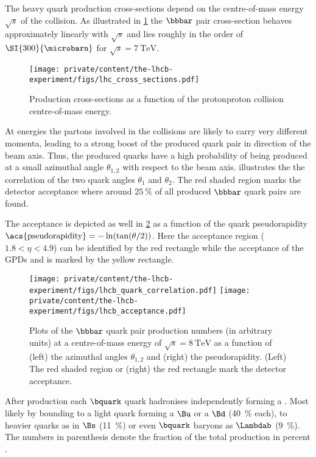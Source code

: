 The heavy quark production cross-sections depend on the centre-of-mass energy
$\sqrt{s}$ of the \protonproton collision. As illustrated in
\cref{fig:lhcb_experiment:detector:cross_section} the $\bbbar$ pair
cross-section behaves approximately linearly with $\sqrt{s}$ and lies roughly in
the order of $\SI{300}{\microbarn}$ for $\sqrt{s}=\SI{7}{\TeV}$.
%
\begin{figure}[t]
  \centering
    \texttt{[image: private/content/the-lhcb-experiment/figs/lhc\_cross\_sections.pdf]}
  \caption{
    Production cross-sections as a function of the \acl{protonproton} collision centre-of-mass energy. \cite{Campbell:2006wx}
  }
  \label{fig:lhcb_experiment:detector:cross_section}
\end{figure}
%
At \LHC energies the partons involved in the collisions are likely to carry very
different momenta, leading to a strong boost of the produced quark pair in
direction of the beam axis. Thus, the produced quarks have a high probability of
being produced at a small azimuthal angle $\theta_{1,2}$ with respect to the
beam axis.  illustrates the the
correlation of the two quark angles $\theta_{1}$ and $\theta_{2}$. The red
shaded region marks the \LHCb detector acceptance where around
$\SI{25}{\percent}$ of all produced $\bbbar$ quark pairs are found.

The acceptance is depicted as well in
\cref{fig:lhcb_experiment:detector:production} as a function of the quark
\acl{pseudorapidity} $\text{\acs{pseudorapidity}} = -\ln(\tan(\theta/2))$. Here
the \LHCb acceptance region ($\num{1.8} < \eta < \num{4.9}$) can be identified
by the red rectangle while the acceptance of the \acfp{GPD} \ATLAS and \CMS is
marked by the yellow rectangle.
%
\begin{figure}[t]
  \centering
    \texttt{[image: private/content/the-lhcb-experiment/figs/lhcb\_quark\_correlation.pdf]}
    \texttt{[image: private/content/the-lhcb-experiment/figs/lhcb\_acceptance.pdf]}
  \caption{
    Plots of the $\bbbar$ quark pair production numbers (in arbitrary units) at
  a centre-of-mass energy of $\sqrt{s} = \SI{8}{\TeV}$ as a function of (left)
  the azimuthal angles $\theta_{1,2}$ and (right) the \acf{pseudorapidity}.
  (Left) The red shaded region or (right) the red rectangle mark the \LHCb
  detector acceptance.}
  \label{fig:lhcb_experiment:detector:production}
\end{figure}
%

After production each $\bquark$ quark hadronises independently forming a
\bhadron. Most likely by bounding to a light quark forming a $\Bu$ or a $\Bd$
(\SI{40}{\percent} each), to heavier quarks as in $\Bs$ (\SI{11}{\percent}) or
even $\bquark$ baryons as $\Lambdab$ (\SI{9}{\percent}). The numbers in
parenthesis denote the fraction of the total production in percent
\cite{Agashe:2014kda}.

